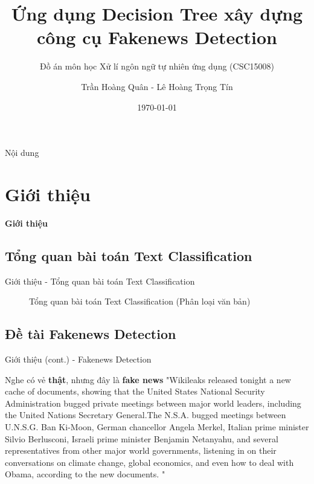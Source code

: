 \documentclass[aspectratio=169,xcolor=dvipsnames]{beamer}
\title[Fakenews Detection]{Ứng dụng Decision Tree xây dựng \\ công cụ Fakenews Detection}
\subtitle{Đồ án môn học Xử lí ngôn ngữ tự nhiên ứng dụng (CSC15008)}
\author[Quan-Tran] {Trần Hoàng Quân - Lê Hoàng Trọng Tín}
\institute[HCMUS]
{
    Khoa Công nghệ thông tin \\
    Trường Đại học Khoa học Tự nhiên - ĐHQG HCM
}
\date{\today}
\begin{document}
\begin{frame}
    \titlepage
\end{frame}

\begin{frame}{Nội dung}
    \tableofcontents
\end{frame}

\section{Giới thiệu}

\begin{frame}
	\Huge{\centerline{\textbf{Giới thiệu}}}
\end{frame}

\subsection{Tổng quan bài toán Text Classification}
\begin{frame}{Giới thiệu - Tổng quan bài toán Text Classification}
\begin{figure}[H]
	\caption{Tổng quan bài toán Text Classification (Phân loại văn bản)\cite{Kowsari_2019}}
\end{figure}
\end{frame}

\subsection{Đề tài Fakenews Detection}
\begin{frame}{Giới thiệu (cont.) - Fakenews Detection}
\begin{alertblock}{Nghe có vẻ \textbf{thật}, nhưng đây là \textbf{fake news}}
"Wikileaks released tonight a new cache of documents, showing that the United States  National Security Administration bugged private meetings between major world leaders, including the United Nations Secretary General.The N.S.A. bugged meetings between U.N.S.G. Ban Ki-Moon, German chancellor Angela Merkel, Italian prime minister Silvio Berlusconi, Israeli prime minister Benjamin Netanyahu, and several representatives from other major world governments, listening in on their conversations on climate change, global economics, and even  how to deal with Obama,  according to the new documents. "
\end{alertblock}
\end{frame}
\end{document}
